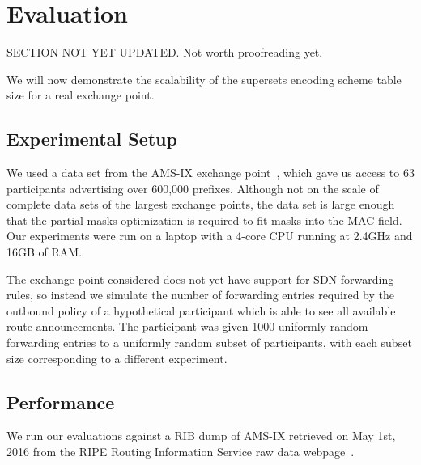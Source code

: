 \section{Evaluation} \label{sec:evaluation}
SECTION NOT YET UPDATED. Not worth proofreading yet. 

We will now demonstrate the scalability of the supersets encoding scheme table size for a real exchange point. 

\subsection{Experimental Setup}
We used a data set from the AMS-IX exchange point~\cite{ams-ix}, which gave us access to 63 participants advertising over 600,000 prefixes. Although not on the scale of complete data sets of the largest exchange points, the data set is large enough that the partial masks optimization is required to fit masks into the MAC field. Our experiments were run on a laptop with a 4-core CPU running at 2.4GHz and 16GB of RAM.

The exchange point considered does not yet have support for SDN forwarding rules, so instead we simulate the number of forwarding entries required by the outbound policy of a hypothetical participant which is able to see all available route announcements. The participant was given 1000 uniformly random forwarding entries to a uniformly random subset of participants, with each subset size corresponding to a different experiment. 

\subsection{Performance}
We run our evaluations against a RIB dump of AMS-IX retrieved on May 1st, 2016 from the RIPE Routing Information Service raw data webpage~\cite{ris}.

